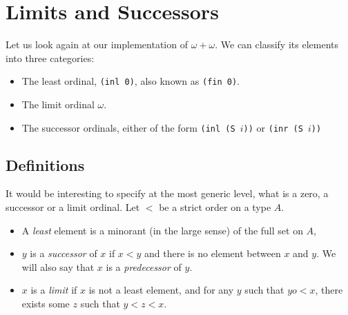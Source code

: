 
  




%



\section{Limits and Successors}

Let us look again at our implementation of $\omega+\omega$. We can classify its elements into three categories:

\begin{itemize}
\item The least ordinal, \texttt{(inl 0)}, also known as  \texttt{(fin 0)}.
\item The limit ordinal $\omega$.
\item The successor ordinals, either of the form \texttt{(inl (S $i$))} or \texttt{(inr (S $i$))}
\end{itemize}

\subsection{Definitions}
It would be interesting to specify at the most generic level, what is a zero, a successor or a limit ordinal. Let $<$ be a strict order on a type $A$.

\begin{itemize}
\item A \emph{least} element is a minorant (in the large sense) of the full set  on $A$,
\item $y$ is a \emph{successor} of $x$ if $x<y$ and there is no element between $x$ and $y$. We will also say that $x$ is a \emph{predecessor} of $y$.
\item $x$ is a \emph{limit} if $x$ is not a least element, and for any $y$ such that $yo<x$,
 there exists some $z$ such that $y<z<x$.
\end{itemize}


